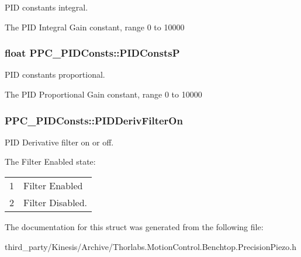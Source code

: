 P\+ID constants integral. 

The P\+ID Integral Gain constant, range 0 to 10000
\subsubsection[{\texorpdfstring{P\+I\+D\+ConstsP}{PIDConstsP}}]{\setlength{\rightskip}{0pt plus 5cm}float P\+P\+C\+\_\+\+P\+I\+D\+Consts\+::\+P\+I\+D\+ConstsP}\hypertarget{struct_p_p_c___p_i_d_consts_a167bc117b598c86d31b7479e918e66ba}{}\label{struct_p_p_c___p_i_d_consts_a167bc117b598c86d31b7479e918e66ba}


P\+ID constants proportional. 

The P\+ID Proportional Gain constant, range 0 to 10000
\subsubsection[{\texorpdfstring{P\+I\+D\+Deriv\+Filter\+On}{PIDDerivFilterOn}}]{ P\+P\+C\+\_\+\+P\+I\+D\+Consts\+::\+P\+I\+D\+Deriv\+Filter\+On}\hypertarget{struct_p_p_c___p_i_d_consts_aad9f651e289da93ed9d4dc1698c3fa66}{}\label{struct_p_p_c___p_i_d_consts_aad9f651e289da93ed9d4dc1698c3fa66}


P\+ID Derivative filter on or off. 

The Filter Enabled state\+: \tabulinesep=1mm
\begin{longtabu} spread 0pt [c]{*2{|X[-1]}|}
&Filter Enabled \\
2&Filter Disabled. \\
\end{longtabu}


The documentation for this struct was generated from the following file\+:\begin{DoxyCompactItemize}
\item 
third\+\_\+party/\+Kinesis/\+Archive/Thorlabs.\+Motion\+Control.\+Benchtop.\+Precision\+Piezo.\+h\end{DoxyCompactItemize}
